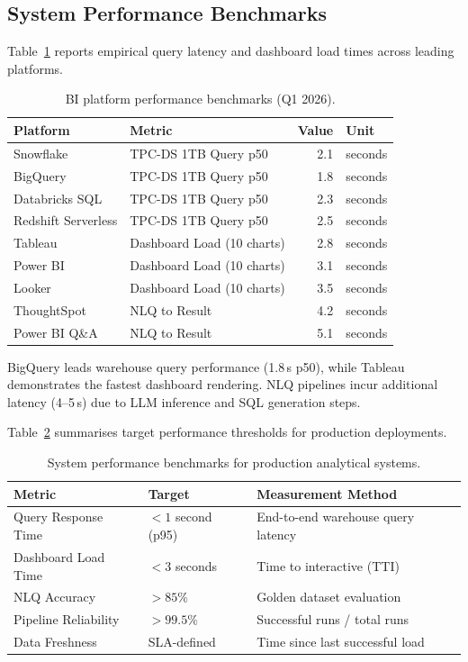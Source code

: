 \documentclass[12pt, a4paper]{article}
\begin{document}
\subsection{System Performance Benchmarks}

Table~\ref{tab:bi-perf} reports empirical query latency and dashboard load times across leading platforms.

\begin{table}[ht]
\centering
\caption{BI platform performance benchmarks (Q1 2026).}
\label{tab:bi-perf}
\begin{tabular}{llrl}
\toprule
\textbf{Platform} & \textbf{Metric} & \textbf{Value} & \textbf{Unit} \\
\midrule
Snowflake          & TPC-DS 1TB Query p50    & 2.1 & seconds \\
BigQuery           & TPC-DS 1TB Query p50    & 1.8 & seconds \\
Databricks SQL     & TPC-DS 1TB Query p50    & 2.3 & seconds \\
Redshift Serverless & TPC-DS 1TB Query p50   & 2.5 & seconds \\
\midrule
Tableau            & Dashboard Load (10 charts) & 2.8 & seconds \\
Power BI           & Dashboard Load (10 charts) & 3.1 & seconds \\
Looker             & Dashboard Load (10 charts) & 3.5 & seconds \\
\midrule
ThoughtSpot        & NLQ to Result           & 4.2 & seconds \\
Power BI Q\&A      & NLQ to Result           & 5.1 & seconds \\
\bottomrule
\end{tabular}
\end{table}

BigQuery leads warehouse query performance (1.8\,s p50), while Tableau demonstrates the fastest dashboard rendering. NLQ pipelines incur additional latency (4--5\,s) due to LLM inference and SQL generation steps.

Table~\ref{tab:performance} summarises target performance thresholds for production deployments.

\begin{table}[ht]
\centering
\caption{System performance benchmarks for production analytical systems.}
\label{tab:performance}
\begin{tabular}{lll}
\toprule
\textbf{Metric} & \textbf{Target} & \textbf{Measurement Method} \\
\midrule
Query Response Time     & $<1$ second (p95) & End-to-end warehouse query latency \\
Dashboard Load Time     & $<3$ seconds      & Time to interactive (TTI) \\
NLQ Accuracy            & $>85\%$           & Golden dataset evaluation \\
Pipeline Reliability    & $>99.5\%$         & Successful runs / total runs \\
Data Freshness          & SLA-defined       & Time since last successful load \\
\bottomrule
\end{tabular}
\end{table}
\end{document}
